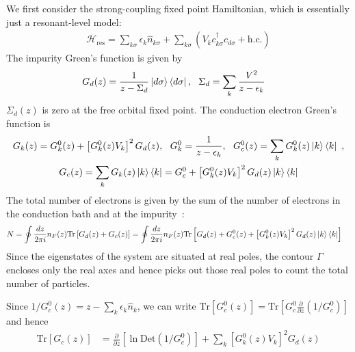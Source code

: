 We first consider the strong-coupling fixed point Hamiltonian, which is essentially just a resonant-level model:
\begin{equation}\begin{aligned}
	\mathcal{H}_\text{res} = \sum_{k\sigma}\epsilon_k \hat n_{k\sigma} + \sum_{k\sigma}\left(V_k c^\dagger_{k\sigma} c_{d\sigma} + \text{h.c.}\right)
\end{aligned}\end{equation}
The impurity Green's function is given by~\cite{anderson_1961,hewson1993,coleman2015}
\begin{equation}\begin{aligned}
	G_{d}(z) &= \frac{1}{z - \Sigma_d}\ket{d\sigma}\bra{d\sigma}, ~ ~ \Sigma_d = \sum_k \frac{V^2}{z - \epsilon_k}
\end{aligned}\end{equation}
\(\Sigma_d(z)\) is zero at the free orbital fixed point. The conduction electron Green's function is 
\begin{gather}
	G_{k}(z) = G_k^0(z) + \left[G_k^0(z)V_k\right]^2 G_{d}(z), ~ ~ G_k^0 = \frac{1}{z - \epsilon_k}, ~ ~ G_c^0(z) = \sum_k G_k^0(z)\ket{k}\bra{k}~,\\
	G_c(z) = \sum_k G_k(z)\ket{k}\bra{k} = G_c^0 + \left[G_k^0(z)V_k\right]^2 G_{d}(z)\ket{k}\bra{k} 
\end{gather}
The total number of electrons is given by the sum of the number of electrons in the conduction bath and at the impurity~\cite{hewson1993,langreth1966}:
\begin{equation}\begin{aligned}
	\label{tot_num}
	N &= \oint \frac{dz}{2\pi i}n_F(z) \text{Tr}\left[G_{d}(z) + G_c(z)\right] = \oint \frac{dz}{2\pi i}n_F(z) \text{Tr}\left[G_{d}(z) + G_c^0(z) + \left[G_k^0(z)V_k\right]^2 G_{d}(z)\ket{k}\bra{k}\right]
\end{aligned}\end{equation}
Since the eigenstates of the system are situated at real poles, the contour \(\Gamma\) encloses only the real axes and hence picks out those real poles to count the total number of particles.

Since \(1/G_{c}^0(z) = z - \sum_k \epsilon_k \hat n_k\), we can write \(\text{Tr}\left[G_{c}^{0}(z)\right] = \text{Tr}\left[G_{c}^{0} \frac{\partial{}}{\partial{z}}\left(1/G_{c}^{0}\right)\right]\) and hence
\begin{equation}\begin{aligned}
	\label{simple_bath}
	\text{Tr}\left[G_c(z)\right] &=\frac{\partial{}}{\partial{z}}\left[\ln \text{Det}\left(1/G_{c}^{0}\right)\right] + \sum_k\left[G_k^0(z)V_k\right]^2 G_{d}(z)
\end{aligned}\end{equation}


